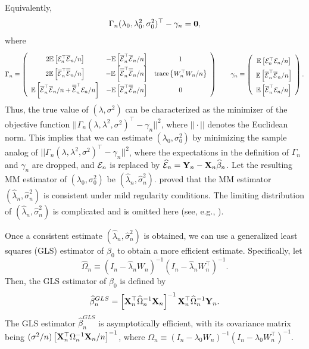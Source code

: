 \documentclass[11pt, A4paper, openany, uplatex]{book}
\begin{document}
Equivalently,
\begin{align*}
	\Gamma_n (\lambda_0, \lambda_0^2, \sigma_0^2)^\top - \gamma_n = \mathbf{0},
\end{align*}
where
\[\renewcommand{\arraystretch}{1.8}
	\Gamma_n \equiv \left(
	\begin{array}{ccc}
	2 \E\left[ \mcl{E}_n^\top \bar{\mcl{E}}_n/n \right] 
	& - \E\left[ \bar{\mcl{E}}_n^\top \bar{\mcl{E}}_n/n \right] 
	& 1 \\
	2 \E\left[ \bar{\mcl{E}}_n^\top \bar{\bar{\mcl{E}}}_n/n \right] 
	& - \E\left[ \bar{\bar{\mcl{E}}}_n^\top \bar{\bar{\mcl{E}}}_n/n \right] 
	& \mrm{trace}\left\{ W_n^\top W_n/n \right\}  \\
	\E\left[ \bar{\mcl{E}}_n^\top \bar{\mcl{E}}_n/n + \bar{\bar{\mcl{E}}}_n^\top \mcl{E}_n/n\right] 
	& - \E\left[ \bar{\mcl{E}}_n^\top \bar{\bar{\mcl{E}}}_n/n \right]  
	& 0
	\end{array}
	\right)
	\qquad
	\gamma_n \equiv \left(\begin{array}{c}
	\E\left[ \mcl{E}_n^\top \mcl{E}_n /n\right] \\
	\E\left[ \bar{\mcl{E}}_n^\top \bar{\mcl{E}}_n/n \right] \\
	\E\left[ \bar{\mcl{E}}_n^\top \mcl{E}_n/n \right]
	\end{array}
	\right).
\]\renewcommand{\arraystretch}{1}
Thus, the true value of $(\lambda, \sigma^2)$ can be characterized as the minimizer of the objective function $|| \Gamma_n (\lambda, \lambda^2, \sigma^2)^\top - \gamma_n ||^2$, where $|| \cdot ||$ denotes the Euclidean norm.
This implies that we can estimate $(\lambda_0, \sigma^2_0)$ by minimizing the sample analog of $|| \Gamma_n (\lambda, \lambda^2, \sigma^2)^\top - \gamma_n ||^2$, where the expectations in the definition of $\Gamma_n$ and $\gamma_n$ are dropped, and $\mathcal{E}_n$ is replaced by $\widehat{\mathcal{E}}_n = \mathbf{Y}_n - \mathbf{X}_n\widehat \beta_n$.
Let the resulting MM estimator of  $(\lambda_0, \sigma^2_0)$ be $(\hat \lambda_n, \hat \sigma_n^2)$.
\cite{kelejian1999generalized} proved that the MM estimator $(\hat \lambda_n, \hat \sigma_n^2)$ is consistent under mild regularity conditions.
The limiting distribution of $(\hat \lambda_n, \hat \sigma_n^2)$ is complicated and is omitted here (see, e.g., \cite{kelejian2010specification}).
\bigskip

Once a consistent estimate $(\hat \lambda_n, \hat \sigma_n^2)$ is obtained, we can use a generalized least squares (GLS) estimator of $\beta_0$ to obtain a more efficient estimate.
Specifically, let
\[
	\hat \Omega_n \equiv (I_n - \hat \lambda_n W_n)^{-1}(I_n - \hat \lambda_n W_n^\top)^{-1} .
\]
Then, the GLS estimator of $\beta_0$ is defined by
\begin{align}\label{eq:gls}
	\widehat \beta_n^{GLS} = \left[\mathbf{X}_n^\top \widehat \Omega_n^{-1} \mathbf{X}_n \right]^{-1} \mathbf{X}_n^\top \widehat \Omega_n^{-1} \mathbf{Y}_n.
\end{align}
The GLS estimator $\hat \beta_n^{GLS}$ is asymptotically efficient, with its covariance matrix being $ (\sigma^2/n)\left[\mathbf{X}_n^\top \Omega_n^{-1} \mathbf{X}_n / n \right]^{-1}$, where $\Omega_n \equiv (I_n - \lambda_0 W_n)^{-1}(I_n - \lambda_0 W_n^\top)^{-1}$.
\end{document}
